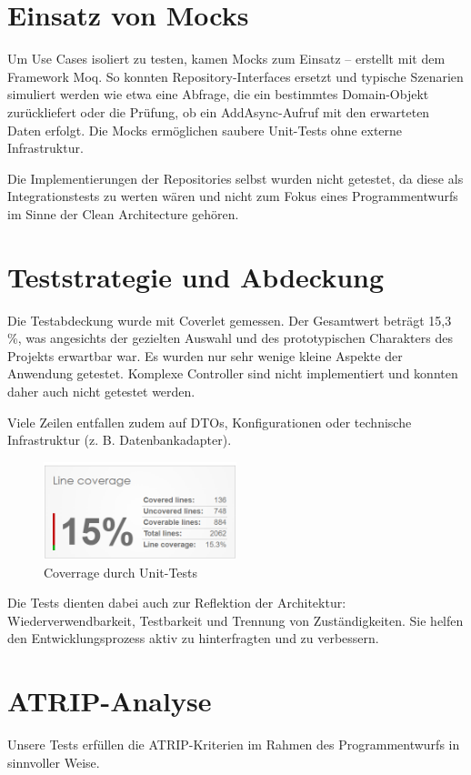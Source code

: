 \section{Einsatz von Mocks}
Um Use Cases isoliert zu testen, kamen Mocks zum Einsatz – erstellt mit dem Framework Moq. So konnten Repository-Interfaces ersetzt und typische
Szenarien simuliert werden wie etwa eine Abfrage, die ein bestimmtes Domain-Objekt zurückliefert oder die Prüfung, ob ein AddAsync-Aufruf mit
den erwarteten Daten erfolgt. Die Mocks ermöglichen saubere Unit-Tests ohne externe Infrastruktur.

Die Implementierungen der Repositories selbst wurden nicht getestet, da diese als Integrationstests zu werten wären und nicht zum Fokus eines Programmentwurfs im Sinne der Clean Architecture gehören.

\section{Teststrategie und Abdeckung}
Die Testabdeckung wurde mit Coverlet gemessen. Der Gesamtwert beträgt 15,3 \%, was angesichts der gezielten Auswahl und des prototypischen Charakters des Projekts erwartbar war.
Es wurden nur sehr wenige kleine Aspekte der Anwendung getestet. Komplexe Controller sind nicht implementiert und konnten daher auch nicht getestet werden.

Viele Zeilen entfallen zudem auf DTOs, Konfigurationen oder technische Infrastruktur (z. B. Datenbankadapter).

\begin{figure}[H]
\centering
\includegraphics[width=0.50\textwidth]{img/coverage.png}
\caption{Coverrage durch Unit-Tests}
\end{figure}

Die Tests dienten dabei auch zur Reflektion der Architektur: Wiederverwendbarkeit, Testbarkeit und Trennung von Zuständigkeiten. Sie helfen den Entwicklungsprozess aktiv zu hinterfragten und zu verbessern.

\section{ATRIP-Analyse}
Unsere Tests erfüllen die ATRIP-Kriterien im Rahmen des Programmentwurfs in sinnvoller Weise.

